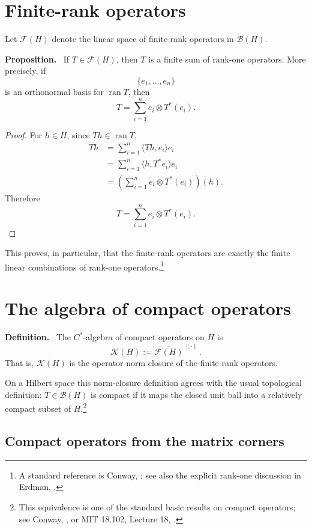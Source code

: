\documentclass[11pt]{article}
\newcommand{\BH}{\mathcal{B}(H)}
\newcommand{\FH}{\mathcal{F}(H)}
\newcommand{\KH}{\mathcal{K}(H)}
\newcommand{\ran}{\operatorname{ran}}
\newenvironment{definition}{\par\medskip\noindent\textbf{Definition.}\ }{\par\medskip}
\newenvironment{proposition}{\par\medskip\noindent\textbf{Proposition.}\ }{\par\medskip}
\begin{document}
\section{Finite-rank operators}

Let $\FH$ denote the linear space of finite-rank operators in $\BH$.

\begin{proposition}
If $T\in\FH$, then $T$ is a finite sum of rank-one operators.  More precisely,
if
\[
\{e_1,\ldots,e_n\}
\]
is an orthonormal basis for $\ran T$, then
\[
\boxed{
T=\sum_{i=1}^{n}e_i\otimes T^*(e_i).
}
\]
\end{proposition}

\begin{proof}
For $h\in H$, since $Th\in\ran T$,
\begin{align*}
Th
 &=\sum_{i=1}^{n}\langle Th,e_i\rangle e_i\\
 &=\sum_{i=1}^{n}\langle h,T^*e_i\rangle e_i\\
 &=\left(\sum_{i=1}^{n}e_i\otimes T^*(e_i)\right)(h).
\end{align*}
Therefore
\[
T=\sum_{i=1}^{n}e_i\otimes T^*(e_i).
\]
\end{proof}

This proves, in particular, that the finite-rank operators are exactly the finite
linear combinations of rank-one operators.\footnote{A standard reference is Conway,
\cite[Chapter II, \S4]{Conway1990}; see also the explicit rank-one discussion in
Erdman, \cite[\S 7.3]{Erdman2011}.}

\section{The algebra of compact operators}

\begin{definition}
The $C^*$-algebra of compact operators on $H$ is
\[
\boxed{
\KH:=\overline{\FH}^{\,\|\cdot\|}.
}
\]
That is, $\KH$ is the operator-norm closure of the finite-rank operators.
\end{definition}

On a Hilbert space this norm-closure definition agrees with the usual topological
definition: $T\in\BH$ is compact if it maps the closed unit ball into a relatively
compact subset of $H$.\footnote{This equivalence is one of the standard basic results
on compact operators; see Conway, \cite[Chapter II, Theorem 4.4]{Conway1990}, or
MIT 18.102, Lecture 18, \cite{MIT2009}.}

\subsection{Compact operators from the matrix corners}
\end{document}
